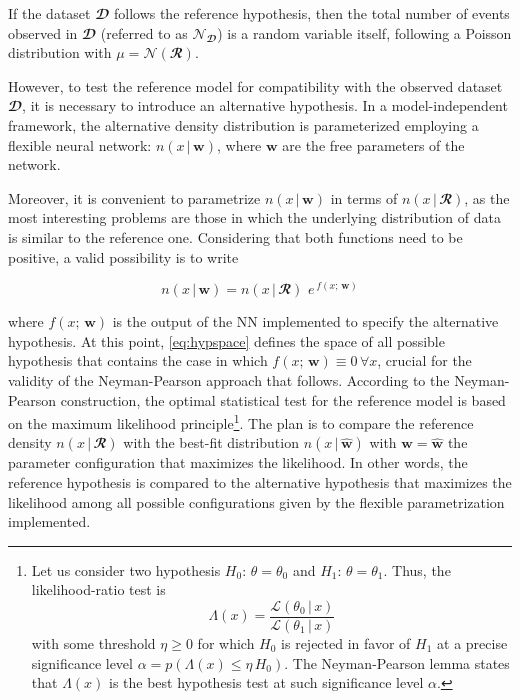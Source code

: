 \noindent If the dataset $\mathbfcal{D}$ follows the reference hypothesis, then the total number of events
observed in $\mathbfcal{D}$ (referred to as $\mathcal{N}_{\mathbfcal{D}}$) is a random variable itself, following a
Poisson distribution with $\mu=\mathcal{N}(\mathbfcal{R})$. 

However, to test the reference model for compatibility with the observed dataset $\mathbfcal{D}$, it is necessary to
introduce an alternative hypothesis. In a model-independent framework, the alternative density distribution is
parameterized employing a flexible neural network: $n(x\,|\,\mathbf{w})$, where $\mathbf{w}$ are the free parameters of
the network.

Moreover, it is convenient to parametrize $n(x\,|\,\mathbf{w})$ in terms of $n(x\,|\,\mathbfcal{R})$, as the most
interesting problems are those in which the underlying distribution of data is similar to the reference one. Considering
that both functions need to be positive, a valid possibility is to write

\begin{equation}\label{eq:hypspace}
    n(x\,|\,\mathbf{w})=n(x\,|\,\mathbfcal{R})\,\,e^{\,f(x;\,\mathbf{w})}
\end{equation}

\noindent where $f(x;\,\mathbf{w})$ is the output of the NN implemented to specify the alternative hypothesis. At this
point, \autoref{eq:hypspace} defines the space of all possible hypothesis that contains the case in which
$f(x;\,\mathbf{w})\equiv 0 \,\forall x$, crucial for the validity of the Neyman-Pearson approach that follows. According
to the Neyman-Pearson construction, the optimal statistical test for the reference model is based on the maximum
likelihood principle\footnote{Let us consider two hypothesis $H_0:\,\theta=\theta_0$ and $H_1:\,\theta=\theta_1$. Thus,
the likelihood-ratio test is
\begin{equation*}
    \Lambda(x)=\frac{\mathcal{L}(\theta_0\,|\,x)}{\mathcal{L}(\theta_1\,|\,x)}
\end{equation*}
\noindent with some threshold $\eta \ge 0$ for which $H_0$ is rejected in favor of $H_1$ at a precise significance level
$\alpha = p(\Lambda(x) \le \eta \, H_0)$. The Neyman-Pearson lemma states that $\Lambda(x)$ is the best hypothesis test
at such significance level $\alpha$.}. The plan is to compare the reference density $n(x\,|\,\mathbfcal{R})$ with the
best-fit distribution $n(x\,|\,\widehat{\mathbf{w}})$ with $\mathbf{w}=\widehat{\mathbf{w}}$ the parameter configuration
that maximizes the likelihood. In other words, the reference hypothesis is compared to the alternative hypothesis that
maximizes the likelihood among all possible configurations given by the flexible parametrization implemented.

